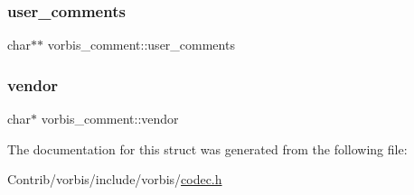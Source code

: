 \mbox{\label{structvorbis__comment_ac45cb70542b0be5ce3e8d85db6df48ec}} 
\subsubsection{\texorpdfstring{user\+\_\+comments}{user\_comments}}
{\footnotesize\ttfamily char$\ast$$\ast$ vorbis\+\_\+comment\+::user\+\_\+comments}

\mbox{\label{structvorbis__comment_a1f25158a2c045a6dd8a13b33b34612d3}} 
\subsubsection{\texorpdfstring{vendor}{vendor}}
{\footnotesize\ttfamily char$\ast$ vorbis\+\_\+comment\+::vendor}



The documentation for this struct was generated from the following file\+:\begin{DoxyCompactItemize}
\item 
Contrib/vorbis/include/vorbis/\mbox{\hyperlink{codec_8h}{codec.\+h}}\end{DoxyCompactItemize}
